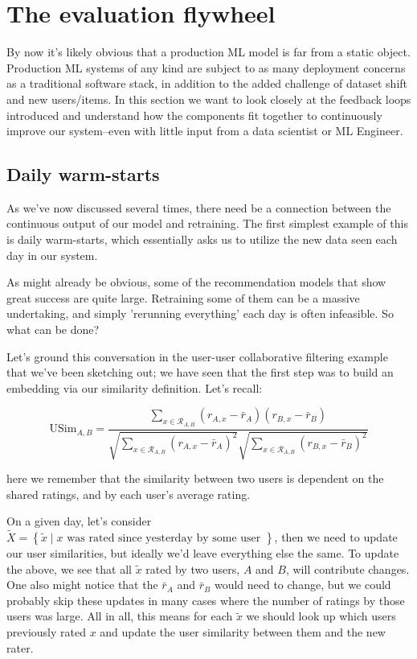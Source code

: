 \chapter{The evaluation flywheel}
\label{ch:serving-and-architecture}

By now it's likely obvious that a production ML model is far from a static object. Production ML systems of any kind are subject to as many deployment concerns as a traditional software stack, in addition to the added challenge of dataset shift and new users/items. In this section we want to look closely at the feedback loops introduced and understand how the components fit together to continuously improve our system–even with little input from a data scientist or ML Engineer.

\section{Daily warm-starts}

As we've now discussed several times, there need be a connection between the continuous output of our model and retraining. The first simplest example of this is daily warm-starts, which essentially asks us to utilize the new data seen each day in our system.

As might already be obvious, some of the recommendation models that show great success are quite large. Retraining some of them can be a massive undertaking, and simply 'rerunning everything' each day is often infeasible. So what can be done? 

Let's ground this conversation in the user-user collaborative filtering example that we've been sketching out; we have seen that the first step was to build an embedding via our similarity definition. Let's recall:

\begin{equation}
\mathrm{USim}_{A,B}=\frac{\sum_{x\in \mathcal{R}_{A,B}}(r_{A,x}-\bar{r}_A)(r_{B,x}-\bar{r}_B)}{\sqrt{\sum_{x\in \mathcal{R}_{A,B}}(r_{A,x}-\bar{r}_A)^2} \sqrt{\sum_{x\in \mathcal{R}_{A,B}}(r_{B,x}-\bar{r}_B)^2}}
\end{equation}

here we remember that the similarity between two users is dependent on the shared ratings, and by each user's average rating. 

On a given day, let's consider $\tilde{X}=\left\lbrace \tilde{x}\mid x\textrm{ was rated since yesterday by some user }\right\rbrace$, then we need to update our user similarities, but ideally we'd leave everything else the same. To update the above, we see that all $\tilde{x}$ rated by two users, $A$ and $B$, will contribute changes. One also might notice that the $\bar{r}_A$ and $\bar{r}_B$ would need to change, but we could probably skip these updates in many cases where the number of ratings by those users was large. All in all, this means for each $\tilde{x}$ we should look up which users previously rated $x$ and update the user similarity between them and the new rater. 


